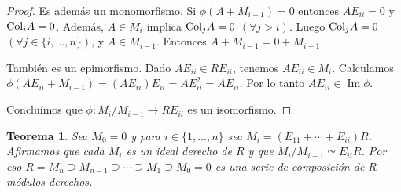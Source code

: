 \documentclass{report}
\newcommand{\Col}{\textnormal{Col}}
\DeclareMathOperator{\image}{\text{Im}}
\newtheorem{theorem}{Teorema}
\begin{document}
\begin{proof}
    Es además un monomorfismo.
    Si \(\phi(A + M_{i - 1}) = 0\) entonces \(A E_{i i} = 0\) y \(\Col_i A = 0\).
    Además, \(A \in M_i\) implica \(\Col_j A = 0\) \((\forall j > i)\).
    Luego \(\Col_j A = 0\) \((\forall j \in \{i, \dots, n\})\), y \(A \in M_{i - 1}\).
    Entonces \(A + M_{i - 1} = 0 + M_{i - 1}\).

    También es un epimorfismo.
    Dado \(A E_{i i} \in R E_{i i}\), tenemos \(A E_{i i} \in M_i\).
    Calculamos \(\phi(A E_{i i} + M_{i - 1})= (A E_{i i}) E_{i i} = A E_{i i}^2 = A E_{i i}\).
    Por lo tanto \(A E_{i i} \in \image \phi\).

    Concluímos que \(\phi : M_i / M_{i - 1} \rightarrow R E_{i i}\) es un isomorfismo.
  \end{proof}

  \begin{theorem}
    Sea \(M_0 = 0\) y para \(i \in \{1, \dots, n\}\) sea \(M_i = (E_{1 1} + \cdots + E_{i i}) R\).
    Afirmamos que cada \(M_i\) es un ideal derecho de \(R\) y que \(M_i / M_{i - 1} \simeq E_{i i} R\).
    Por eso \(R = M_n \supseteq M_{n - 1} \supseteq \cdots \supseteq M_1 \supseteq M_0 = 0\) es una serie de composición de \(R\)-módulos derechos.
  \end{theorem}
\end{document}
